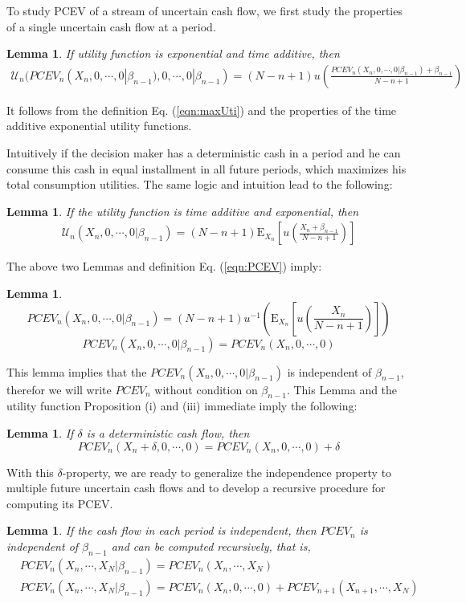 \documentclass{article}[12pt letter]
\newtheorem{lemma}[theorem]{Lemma}
\newcommand{\E}{\mathrm{E}}
\begin{document}
To study PCEV of a stream of uncertain cash flow,  we first study the properties of a single uncertain cash flow at a period.

\begin{lemma} If utility function is exponential and time additive, then
\begin{align} \label{eqn:utiOneFlow}
    \mathcal{U}_n(PCEV_n(X_n,0, \cdots, 0|\beta_{n-1}), 0,\cdots,0|\beta_{n-1}) = (N-n+1)u(\frac{PCEV_n(X_n,0,\cdots,0|\beta_{n-1})+\beta_{n-1}}{N-n+1})
\end{align}
\end{lemma}
\proof It follows from the definition Eq. (\ref{eqn:maxUti}) and the properties of the time additive exponential utility functions. \endproof


Intuitively if the decision maker has a deterministic cash in a period and he can consume this cash in equal installment in all future periods, which maximizes his total consumption utilities.
The same logic and intuition lead to the following:
\begin{lemma}
If the utility function is time additive and exponential, then
\begin{align}
\mathcal{U}_n(X_n,0, \cdots, 0|\beta_{n-1}) =(N-n+1) \E_{X_n} [u(\frac{X_n+\beta_{n-1}}{N-n+1})]
\end{align}
\end{lemma}

The above two Lemmas and definition Eq. (\ref{eqn:PCEV}) imply:
\begin{lemma}
\[PCEV_n(X_n,0,\cdots,0|\beta_{n-1}) = (N-n+1) u^{-1}(\E_{X_n} [u(\frac{X_n}{N-n+1})])\]
\[PCEV_n(X_n,0,\cdots,0|\beta_{n-1}) = PCEV_{n}(X_n,0,\cdots,0) \]
\end{lemma}
This lemma implies that the $PCEV_n(X_n,0,\cdots,0|\beta_{n-1})$ is independent of $\beta_{n-1}$, therefor we will write $PCEV_n$ without condition on $\beta_{n-1}$.
This Lemma and the utility function Proposition (i) and (iii) immediate imply the following:
\begin{lemma}\label{lem:delta}
If $\delta$ is a deterministic cash flow, then
\[PCEV_n(X_n+\delta,0,\cdots,0) = PCEV_n(X_n,0,\cdots,0) + \delta\]
\end{lemma}

With this $\delta$-property, we are ready to generalize the independence property to multiple future uncertain cash flows and to develop a recursive procedure for computing its PCEV.

\begin{lemma}\label{lemma:indCF}
If the cash flow in each period is independent, then $PCEV_n$ is independent of $\beta_{n-1}$ and can be computed recursively, that is,
\begin{align}
&PCEV_n(X_n,\cdots,X_N|\beta_{n-1}) = PCEV_n(X_n,\cdots, X_N) \\
&PCEV_n(X_n, \cdots, X_N|\beta_{n-1}) = PCEV_n(X_n, 0, \cdots, 0) + PCEV_{n+1} (X_{n+1}, \cdots, X_N)
\end{align}
\end{lemma}
\end{document}

